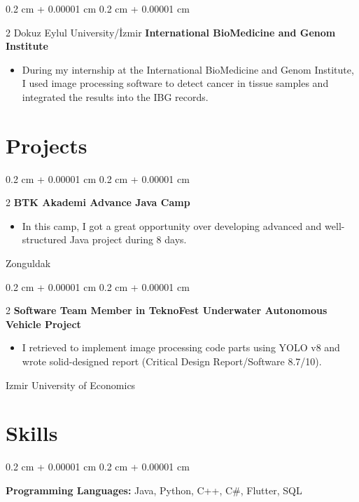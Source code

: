 \documentclass[10pt, letterpaper]{article}
\newenvironment{highlights}{
    \begin{itemize}[
        topsep=0.10 cm,
        parsep=0.10 cm,
        partopsep=0pt,
        itemsep=0pt,
        leftmargin=0.4 cm + 10pt
    ]
}{
    \end{itemize}
}
\newenvironment{onecolentry}{
    \begin{adjustwidth}{
        0.2 cm + 0.00001 cm
    }{
        0.2 cm + 0.00001 cm
    }
}{
    \end{adjustwidth}
}
\newenvironment{twocolentry}[2][]{
    \onecolentry
    \def\secondColumn{#2}
    \setcolumnwidth{\fill, 4.5 cm}
    \begin{paracol}{2}
}{
    \switchcolumn \raggedleft \secondColumn
    \end{paracol}
    \endonecolentry
}
\begin{document}
    \vspace{0.2 cm}

    \begin{twocolentry}{\text{02.2020 - 03.2020}}{Dokuz Eylul University/İzmir}
        \textbf{International BioMedicine and Genom Institute}
        \begin{highlights}
            \item During my internship at the International BioMedicine and Genom Institute, I used image processing software to detect cancer in tissue samples and integrated the results into the IBG records.
        \end{highlights}
    \end{twocolentry}

    \section{Projects}

    \begin{twocolentry}{Zonguldak}{}
        \textbf{BTK Akademi Advance Java Camp}
        \begin{highlights}
            \item In this camp, I got a great opportunity over developing advanced and well-structured Java project during 8 days.
        \end{highlights}
    \end{twocolentry}

    \vspace{0.2 cm}

    \begin{twocolentry}{Izmir University of Economics}{}
        \textbf{Software Team Member in TeknoFest Underwater Autonomous Vehicle Project}
        \begin{highlights}
            \item I retrieved to implement image processing code parts using YOLO v8 and wrote solid-designed report (Critical Design Report/Software 8.7/10).
        \end{highlights}
    \end{twocolentry}

    \section{Skills}

    \begin{onecolentry}
        \textbf{Programming Languages:} Java, Python, C++, C\#, Flutter, SQL
    \end{onecolentry}
\end{document}
